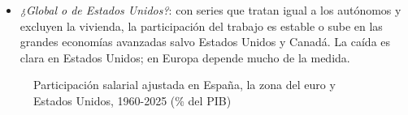 \documentclass[11pt]{article}
\begin{document}
\begin{itemize}
\begin{itemize}
  \item en España, sube hasta el 67,5~\% en 1976, cae al 55~\% en 2007 y desde entonces se mueve entre el 53~y el 58~\% (56,6~\% en 2025)\nocite{CE2026AMECO};
  \item en la zona del euro, la caída es menor y se ha corregido: 58,4~\% en 1995, 54,2~\% en 2007 y 56,9~\% en 2025\nocite{CE2026AMECO}.
  \end{itemize}
\item \emph{¿Global o de Estados Unidos?}: con series que tratan igual a los autónomos y excluyen la vivienda, la participación del trabajo es estable o sube en las grandes economías avanzadas salvo Estados Unidos y Canadá\nocite{GutierrezPiton2020}. La caída es clara en Estados Unidos; en Europa depende mucho de la medida.
\end{itemize}

\begin{figure}[H]
\centering
\caption{Participación salarial ajustada en España, la zona del euro y Estados Unidos, 1960-2025 (\% del PIB)}\label{fig:participacion-trabajo}
\end{figure}
\end{document}
